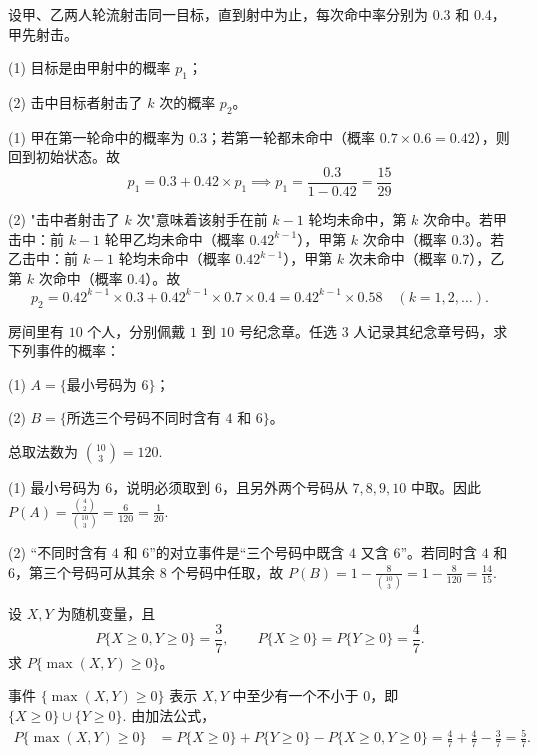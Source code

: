 \documentclass[lang=cn,11pt]{elegantbook}
\begin{document}
\begin{exercise}\label{exer:1-59}
设甲、乙两人轮流射击同一目标，直到射中为止，每次命中率分别为 0.3 和 0.4，甲先射击。\par
(1) 目标是由甲射中的概率 \(p_1\)；\par
(2) 击中目标者射击了 \(k\) 次的概率 \(p_2\)。
\end{exercise}

\begin{solution}
(1) 甲在第一轮命中的概率为 0.3；若第一轮都未命中（概率 \(0.7\times 0.6=0.42\)），则回到初始状态。故
\[
p_1 = 0.3 + 0.42\times p_1 \implies p_1 = \frac{0.3}{1-0.42} = \frac{15}{29} 
\]

(2) "击中者射击了 \(k\) 次"意味着该射手在前 \(k-1\) 轮均未命中，第 \(k\) 次命中。若甲击中：前 \(k-1\) 轮甲乙均未命中（概率 \(0.42^{k-1}\)），甲第 \(k\) 次命中（概率 0.3）。若乙击中：前 \(k-1\) 轮均未命中（概率 \(0.42^{k-1}\)），甲第 \(k\) 次未命中（概率 0.7），乙第 \(k\) 次命中（概率 0.4）。故
\[
p_2 = 0.42^{k-1}\times 0.3 + 0.42^{k-1}\times 0.7\times 0.4 = 0.42^{k-1}\times 0.58 \quad (k=1,2,\dots).
\]
\end{solution}

\begin{exercise}\label{exer:src-2007-a-09}
房间里有 \(10\) 个人，分别佩戴 \(1\) 到 \(10\) 号纪念章。任选 \(3\) 人记录其纪念章号码，求下列事件的概率：\par
(1) \(A=\{\text{最小号码为 }6\}\)；\par
(2) \(B=\{\text{所选三个号码不同时含有 }4\text{ 和 }6\}\)。
\end{exercise}
\begin{solution}
总取法数为
\(
\binom{10}{3}=120.
\)

(1) 最小号码为 \(6\)，说明必须取到 \(6\)，且另外两个号码从 \(7,8,9,10\) 中取。因此
\(P(A)=\frac{\binom42}{\binom{10}{3}}=\frac6{120}=\frac1{20}.\)

(2) “不同时含有 \(4\) 和 \(6\)”的对立事件是“三个号码中既含 \(4\) 又含 \(6\)”。若同时含 \(4\) 和 \(6\)，第三个号码可从其余 \(8\) 个号码中任取，故
\(
P(B)=1-\frac8{\binom{10}{3}}
=1-\frac8{120}
=\frac{14}{15}.
\)
\end{solution}


\begin{exercise}\label{exer:src-2008-probstat-2a-ii-01}
设 \(X,Y\) 为随机变量，且
\[
P\{X\ge0,Y\ge0\}=\frac37,\qquad
P\{X\ge0\}=P\{Y\ge0\}=\frac47.
\]
求 \(P\{\max(X,Y)\ge0\}\)。
\end{exercise}
\begin{solution}
事件 \(\{\max(X,Y)\ge0\}\) 表示 \(X,Y\) 中至少有一个不小于 \(0\)，即
\(
\{X\ge0\}\cup\{Y\ge0\}.
\)
由加法公式，
\[
\begin{aligned}
P\{\max(X,Y)\ge0\}
&=P\{X\ge0\}+P\{Y\ge0\}-P\{X\ge0,Y\ge0\}=\frac47+\frac47-\frac37
=\frac57.
\end{aligned}
\]
\end{solution}
\end{document}
